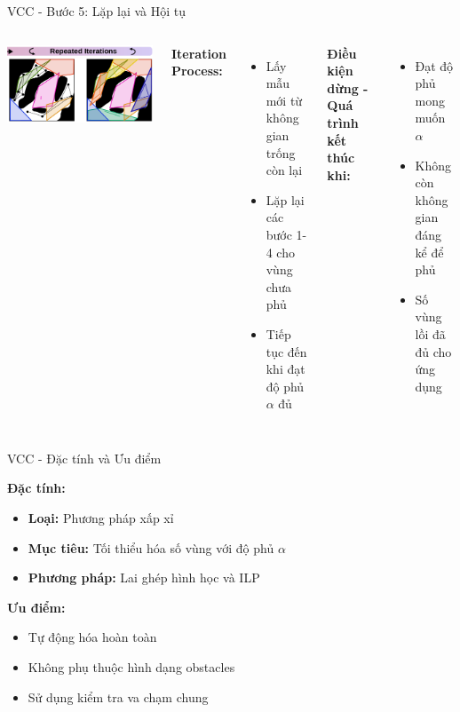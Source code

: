 \documentclass[aspectratio=169]{beamer}
\begin{document}
\begin{frame}{VCC - Bước 5: Lặp lại và Hội tụ}
    \begin{columns}[c]
        \centering
        \includegraphics[width=\textwidth]{../imgs/VCC-5.png}

        \textbf{Iteration Process:}
        \begin{itemize}
            \item Lấy mẫu mới từ không gian trống còn lại
            \item Lặp lại các bước 1-4 cho vùng chưa phủ
            \item Tiếp tục đến khi đạt độ phủ $\alpha$ đủ
        \end{itemize}

        \vspace{0.5em}
        \textbf{Điều kiện dừng - Quá trình kết thúc khi:}
        \begin{itemize}
            \item Đạt độ phủ mong muốn $\alpha$
            \item Không còn không gian đáng kể để phủ
            \item Số vùng lồi đã đủ cho ứng dụng
        \end{itemize}
    \end{columns}
\end{frame}


\begin{frame}{VCC - Đặc tính và Ưu điểm}

    \textbf{Đặc tính:}
    \begin{itemize}
        \item \textbf{Loại:} Phương pháp xấp xỉ
        \item \textbf{Mục tiêu:} Tối thiểu hóa số vùng với độ phủ $\alpha$
        \item \textbf{Phương pháp:} Lai ghép hình học và ILP
    \end{itemize}

    \vspace{1em}
    \textbf{Ưu điểm:}
    \begin{itemize}
        \item Tự động hóa hoàn toàn
        \item Không phụ thuộc hình dạng obstacles
        \item Sử dụng kiểm tra va chạm chung
    \end{itemize}

\end{frame}
\end{document}
